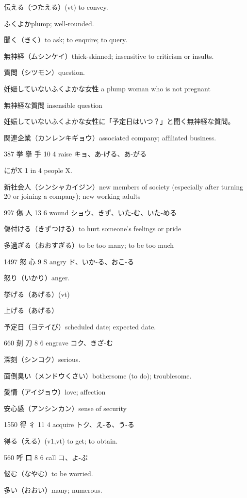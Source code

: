 伝える（つたえる）(vt) to convey.

ふくよかplump; well-rounded.

聞く（きく）to ask; to enquire; to query.

無神経（ムシンケイ）thick-skinned; insensitive to criticism or insults.

質問（シツモン）question.

妊娠していないふくよかな女性
a plump woman who is not pregnant

無神経な質問
insensible question

妊娠していないふくよかな女性に「予定日はいつ？」と聞く無神経な質問。

関連企業（カンレンキギョウ）associated company; affiliated business.

387	挙	擧	手	10	4		raise	キョ、あ-げる、あ-がる

にがX 1 in 4 people X.

新社会人（シンシャカイジン）new members of society (especially after turning 20 or joining a company); new working adults

997	傷		人	13	6		wound	ショウ、きず、いた-む、いた-める

傷付ける（きずつける）to hurt someone's feelings or pride

多過ぎる（おおすぎる）to be too many; to be too much

1497	怒		心	9	S		angry	ド、いか-る、おこ-る

怒り（いかり）anger.

挙げる（あげる）(vt)

上げる（あげる）

予定日（ヨテイび）scheduled date; expected date.

660	刻		刀	8	6		engrave	コク、きざ-む

深刻（シンコク）serious.

面倒臭い（メンドウくさい）bothersome (to do); troublesome.

愛情（アイジョウ）love; affection

安心感（アンシンカン）sense of security

1550	得		彳	11	4		acquire	トク、え-る、う-る

得る（える）(v1,vt) to get; to obtain.

560	呼		口	8	6		call	コ、よ-ぶ

悩む（なやむ）to be worried.

多い（おおい）many; numerous.


